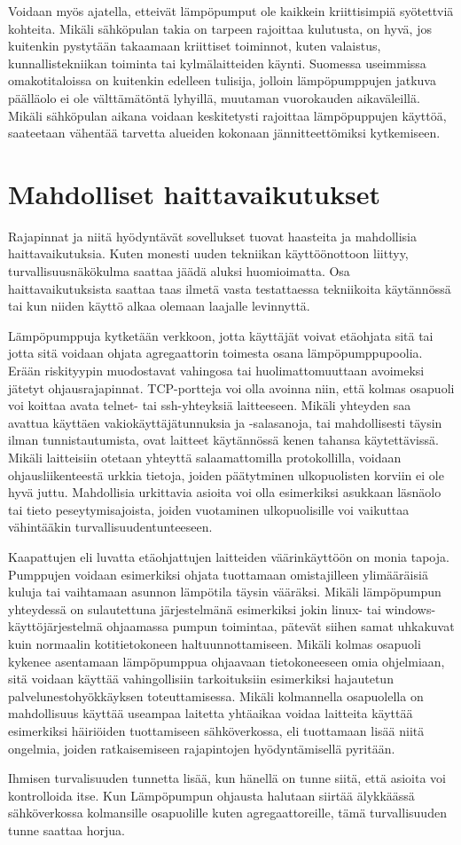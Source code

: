   Voidaan myös ajatella, etteivät lämpöpumput ole kaikkein kriittisimpiä syötettviä kohteita. Mikäli sähköpulan takia on tarpeen rajoittaa kulutusta, on hyvä, jos kuitenkin pystytään takaamaan kriittiset toiminnot, kuten valaistus, kunnallistekniikan toiminta tai kylmälaitteiden käynti. Suomessa useimmissa omakotitaloissa on kuitenkin edelleen tulisija, jolloin lämpöpumppujen jatkuva päälläolo ei ole välttämätöntä lyhyillä, muutaman vuorokauden aikaväleillä. Mikäli sähköpulan aikana voidaan keskitetysti rajoittaa lämpöpuppujen käyttöä, saateetaan vähentää tarvetta alueiden kokonaan jännitteettömiksi kytkemiseen.

\section{Mahdolliset haittavaikutukset}

  Rajapinnat ja niitä hyödyntävät sovellukset tuovat haasteita ja mahdollisia haittavaikutuksia. Kuten monesti uuden tekniikan käyttöönottoon liittyy, turvallisuusnäkökulma saattaa jäädä aluksi huomioimatta. Osa haittavaikutuksista saattaa taas ilmetä vasta testattaessa tekniikoita käytännössä tai kun niiden käyttö alkaa olemaan laajalle levinnyttä.

  Lämpöpumppuja kytketään verkkoon, jotta käyttäjät voivat etäohjata sitä tai jotta sitä voidaan ohjata agregaattorin toimesta osana lämpöpumppupoolia. Erään riskityypin muodostavat vahingosa tai huolimattomuuttaan avoimeksi jätetyt ohjausrajapinnat. TCP-portteja voi olla avoinna niin, että kolmas osapuoli voi koittaa avata telnet- tai ssh-yhteyksiä laitteeseen. Mikäli yhteyden saa avattua käyttäen vakiokäyttäjätunnuksia ja -salasanoja,  tai mahdollisesti täysin ilman tunnistautumista, ovat laitteet käytännössä kenen tahansa käytettävissä. Mikäli laitteisiin otetaan yhteyttä salaamattomilla protokollilla, voidaan ohjausliikenteestä urkkia tietoja, joiden päätytminen ulkopuolisten korviin ei ole hyvä juttu. Mahdollisia urkittavia asioita voi olla esimerkiksi asukkaan läsnäolo tai tieto peseytymisajoista, joiden vuotaminen ulkopuolisille voi vaikuttaa vähintääkin turvallisuudentunteeseen.

  Kaapattujen eli luvatta etäohjattujen laitteiden väärinkäyttöön on monia tapoja. Pumppujen voidaan esimerkiksi ohjata tuottamaan omistajilleen ylimääräisiä kuluja tai vaihtamaan asunnon lämpötila täysin vääräksi. Mikäli lämpöpumpun yhteydessä on sulautettuna järjestelmänä esimerkiksi jokin linux- tai windows-käyttöjärjestelmä ohjaamassa pumpun toimintaa, pätevät siihen samat uhkakuvat kuin normaalin kotitietokoneen haltuunnottamiseen. Mikäli kolmas osapuoli kykenee asentamaan lämpöpumppua ohjaavaan tietokoneeseen omia ohjelmiaan, sitä voidaan käyttää vahingollisiin tarkoituksiin esimerkiksi hajautetun palvelunestohyökkäyksen toteuttamisessa. Mikäli kolmannella osapuolella on mahdollisuus käyttää useampaa laitetta yhtäaikaa voidaa laitteita käyttää esimerkiksi häiriöiden tuottamiseen sähköverkossa, eli tuottamaan lisää niitä ongelmia, joiden ratkaisemiseen rajapintojen hyödyntämisellä pyritään.

  Ihmisen turvalisuuden tunnetta lisää, kun hänellä on tunne siitä, että asioita voi kontrolloida itse. Kun Lämpöpumpun ohjausta halutaan siirtää älykkäässä sähköverkossa kolmansille osapuolille kuten agregaattoreille, tämä turvallisuuden tunne saattaa horjua.
